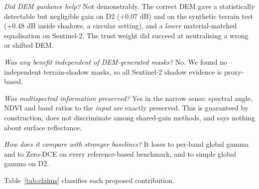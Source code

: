 \documentclass[conference]{IEEEtran}
\begin{document}
\emph{Did DEM guidance help?} Not demonstrably. The correct DEM gave a statistically detectable but negligible gain on D2 (+0.07 dB) and on the synthetic terrain test (+0.48 dB inside shadows, a circular setting), and a \emph{lower} material-matched equalisation on Sentinel-2. The trust weight did succeed at neutralising a wrong or shifted DEM.

\emph{Was any benefit independent of DEM-generated masks?} No. We found no independent terrain-shadow masks, so all Sentinel-2 shadow evidence is proxy-based.

\emph{Was multispectral information preserved?} Yes in the narrow sense: spectral angle, NDVI and band ratios to the \emph{input} are exactly preserved. This is guaranteed by construction, does not discriminate among shared-gain methods, and says nothing about surface reflectance.

\emph{How does it compare with stronger baselines?} It loses to per-band global gamma and to Zero-DCE on every reference-based benchmark, and to simple global gamma on D2.

Table~\ref{tab:claims} classifies each proposed contribution.

\begin{table}[t]
\caption{Evidence status of each proposed contribution.}
\label{tab:claims}
\centering\scriptsize
\setlength{\tabcolsep}{2.5pt}
\end{table}
\end{document}
